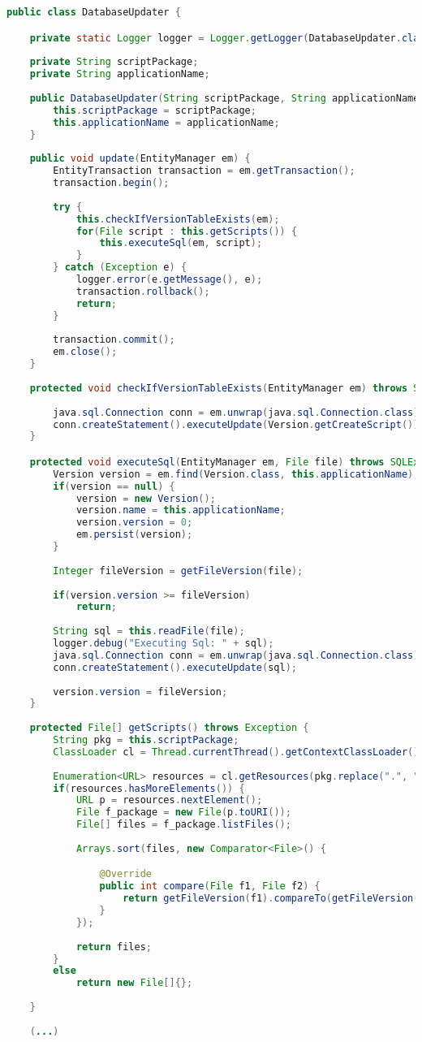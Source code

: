 \label{lst:databaseupdater}
\begin{lstlisting}[language=java, caption=DataBaseUpdater.java]
public class DatabaseUpdater {

	private static Logger logger = Logger.getLogger(DatabaseUpdater.class);
	
	private String scriptPackage;
	private String applicationName;
	
	public DatabaseUpdater(String scriptPackage, String applicationName) {
		this.scriptPackage = scriptPackage;
		this.applicationName = applicationName;		
	}
	
	public void update(EntityManager em) {
		EntityTransaction transaction = em.getTransaction();
		transaction.begin();
		
		try {
			this.checkIfVersionTableExists(em);
			for(File script : this.getScripts()) {
				this.executeSql(em, script);
			}
		} catch (Exception e) {
			logger.error(e.getMessage(), e);
			transaction.rollback();
			return;
		} 
		
		transaction.commit();
		em.close();
	}
	
	protected void checkIfVersionTableExists(EntityManager em) throws SQLException {
		
		java.sql.Connection conn = em.unwrap(java.sql.Connection.class);
		conn.createStatement().executeUpdate(Version.getCreateScript());
	}

	protected void executeSql(EntityManager em, File file) throws SQLException {
		Version version = em.find(Version.class, this.applicationName);
		if(version == null) {
			version = new Version();
			version.name = this.applicationName;
			version.version = 0;
			em.persist(version);
		}
				
		Integer fileVersion = getFileVersion(file);
		
		if(version.version >= fileVersion)
			return;
		
		String sql = this.readFile(file);
		logger.debug("Executing Sql: " + sql);
		java.sql.Connection conn = em.unwrap(java.sql.Connection.class);
		conn.createStatement().executeUpdate(sql);
		
		version.version = fileVersion;
	}
	
	protected File[] getScripts() throws Exception {
		String pkg = this.scriptPackage;
		ClassLoader cl = Thread.currentThread().getContextClassLoader();
		
		Enumeration<URL> resources = cl.getResources(pkg.replace(".", "/"));
		if(resources.hasMoreElements()) {
			URL p = resources.nextElement();
			File f_package = new File(p.toURI());
			File[] files = f_package.listFiles();
			
			Arrays.sort(files, new Comparator<File>() {

				@Override
				public int compare(File f1, File f2) {
					return getFileVersion(f1).compareTo(getFileVersion(f2));
				}
			});
			
			return files;
		}
		else
			return new File[]{};
		
	}
	
	(...)
\end{lstlisting}